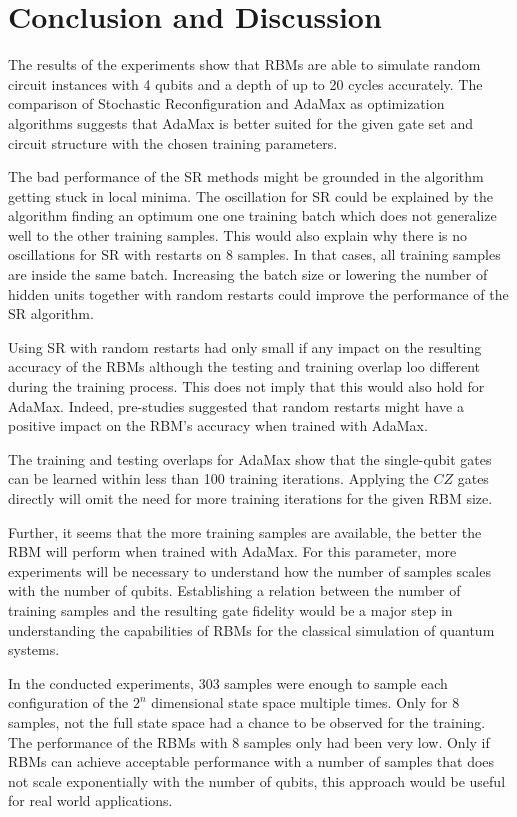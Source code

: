 \chapter{Conclusion and Discussion}

The results of the experiments show that RBMs are able to simulate random circuit 
instances with 4 qubits and a depth of up to 20 cycles accurately. The comparison of 
Stochastic Reconfiguration and AdaMax as optimization algorithms suggests that 
AdaMax is better suited for the given gate set and circuit structure with the chosen training 
parameters. 

The bad performance of the SR methods might be grounded in the algorithm getting stuck in 
local minima. The oscillation for SR could be explained by the algorithm finding an 
optimum one one training batch which does not generalize well to the other training samples.
This would also explain why there is no oscillations for SR with restarts on 8 samples. In that
cases, all training samples are inside the same batch. Increasing the batch size or lowering the 
number of hidden units together with random restarts could improve the performance of the SR algorithm.

Using SR with random restarts had only small if any 
impact on the resulting accuracy of the RBMs although the testing and training overlap 
loo different during the training process. This does not imply that this would also 
hold for AdaMax. Indeed, pre-studies suggested that random restarts might have a positive 
impact on the RBM's accuracy when trained with AdaMax.


The training and testing overlaps for AdaMax show that the single-qubit gates can 
be learned within less than 100 training iterations. Applying 
the $CZ$ gates directly will omit the need for more training iterations for the given RBM size.

Further, it seems that the more training samples are available, the better the RBM will 
perform when trained with AdaMax. For this parameter, more experiments will be necessary 
to understand how the number of samples scales with the number of qubits. Establishing
a relation between the number of training samples and the resulting gate fidelity would 
be a major step in understanding the capabilities of RBMs for the classical simulation of 
quantum systems.

In the conducted experiments, 303 samples were enough to sample each configuration of the 
$2^n$ dimensional state space multiple times. Only for 8  samples, not the full state space
had a chance to be observed for the training. The performance of the RBMs with 8 samples only 
had been very low. Only if RBMs can achieve acceptable performance with a number of samples 
that does not scale exponentially with the number of qubits, this approach would be useful for 
real world applications. 

